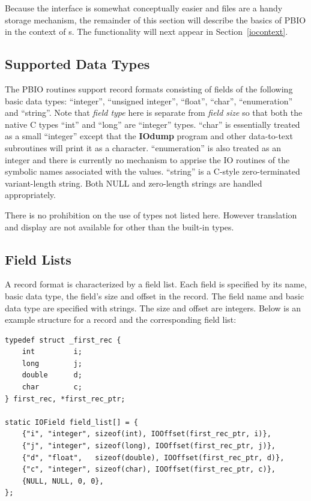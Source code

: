 Because the  interface is somewhat conceptually easier and files are
a handy storage mechanism, the remainder of this section will describe the
basics of PBIO in the context of s.  The  functionality
will next appear in Section~\ref{iocontext}.

\subsection{Supported Data Types\label{sec:datatypes}}

The PBIO routines support record formats consisting of fields of the following
basic data types: ``integer'', ``unsigned integer'', ``float'', ``char'',
``enumeration'' and ``string''.  Note that {\em field type} here is separate
from {\em field size} so that both the native C types ``int'' and ``long'' are
``integer'' types.  ``char'' is essentially treated as a small ``integer''
except that the {\bf IOdump} program and other data-to-text subroutines will
print it as a character. 
``enumeration'' is also treated as an integer and there is currently no
mechanism to apprise the IO routines of the symbolic names associated with the
values.  ``string'' is a C-style zero-terminated variant-length string.  Both
NULL and zero-length strings are handled appropriately.  

There is no prohibition on the use of types not listed here.  However
translation and display are not available for other than the built-in types.

\subsection{Field Lists\label{sec:fieldlist}}
A record format is characterized by a field list.  Each field is specified by
its name, basic data type, the field's size and offset in the record.  The
field name and basic data type are specified with strings.  The size and
offset are integers.  Below is an example structure for a record and the
corresponding field list:
\begin{verbatim}
typedef struct _first_rec {
    int         i;
    long        j;
    double      d;
    char        c;
} first_rec, *first_rec_ptr;

static IOField field_list[] = {
    {"i", "integer", sizeof(int), IOOffset(first_rec_ptr, i)},
    {"j", "integer", sizeof(long), IOOffset(first_rec_ptr, j)},
    {"d", "float",   sizeof(double), IOOffset(first_rec_ptr, d)},
    {"c", "integer", sizeof(char), IOOffset(first_rec_ptr, c)},
    {NULL, NULL, 0, 0},
};
\end{verbatim}

